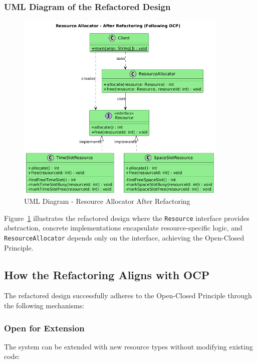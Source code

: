 \subsubsection{UML Diagram of the Refactored Design}

\begin{figure}[H]
    \centering
    \includegraphics[width=0.9\textwidth]{OCP/plantUML/after.png}
    \caption{UML Diagram - Resource Allocator After Refactoring}
    \label{fig:ocp_after}
\end{figure}

Figure~\ref{fig:ocp_after} illustrates the refactored design where the \texttt{Resource} interface provides abstraction, concrete implementations encapsulate resource-specific logic, and \texttt{ResourceAllocator} depends only on the interface, achieving the Open-Closed Principle.

\subsection{How the Refactoring Aligns with OCP}

The refactored design successfully adheres to the Open-Closed Principle through the following mechanisms:

\subsubsection{Open for Extension}

The system can be extended with new resource types without modifying existing code:

